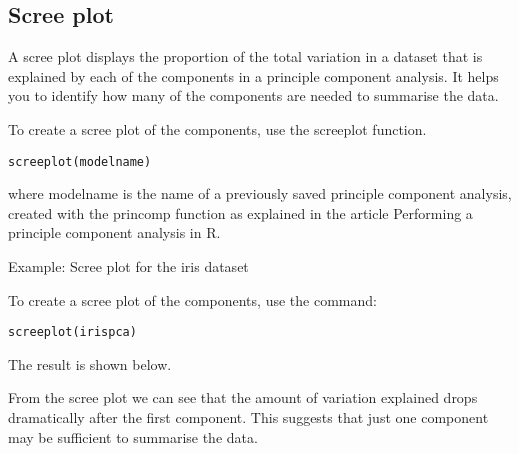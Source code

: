 \documentclass[pca-main.tex]{subfiles}
\begin{document}
 
	\newpage
\subsection{Scree plot}
 
A scree plot displays the proportion of the total variation in a dataset that is explained by each of the components in a principle component analysis.
It helps you to identify how many of the components are needed to summarise the data.
 
To create a scree plot of the components, use the screeplot function.
\begin{verbatim}
screeplot(modelname) 
\end{verbatim}
where modelname is the name of a previously saved principle component analysis, created with the princomp function as explained in the article Performing a principle component analysis in R.
 
Example: Scree plot for the iris dataset
 
 
To create a scree plot of the components, use the command:
\begin{verbatim}
screeplot(irispca) 
\end{verbatim} 
The result is shown below.
 

From the scree plot we can see that the amount of variation explained drops dramatically after the first component. This suggests that just one component may be sufficient to summarise the data.
\end{document}
